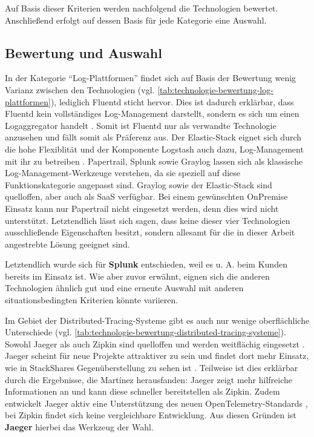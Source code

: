 Auf Basis dieser Kriterien werden nachfolgend die Technologien bewertet. Anschließend erfolgt auf dessen Basis für jede Kategorie eine Auswahl.

\subsection{Bewertung und Auswahl}
\label{subsec:bewertung-und-auswahl}

In der Kategorie \enquote{Log-Plattformen} findet sich auf Basis der Bewertung wenig Varianz zwischen den Technologien (vgl. \autoref{tab:technologie-bewertung-log-plattformen}), lediglich Fluentd sticht hervor. Dies ist dadurch erklärbar, dass Fluentd kein vollständiges Log-Management darstellt, sondern es sich um einen Logaggregator handelt \cite{FluentdAggregator}. Somit ist Fluentd nur als verwandte Technologie anzusehen und fällt somit als Präferenz aus. Der Elastic-Stack eignet sich durch die hohe Flexiblität und der Komponente Logstash auch dazu, Log-Management mit ihr zu betreiben  \cite{ThreatIdentificationFromAccessLogsUsingElasticStack} \cite{DesignLogManagementSystem}. Papertrail, Splunk sowie Graylog lassen sich als klassische Log-Management-Werkzeuge verstehen, da sie speziell auf diese Funktionskategorie angepasst sind. Graylog sowie der Elastic-Stack sind quelloffen, aber auch als SaaS verfügbar. Bei einem gewünschten OnPremise Einsatz kann nur Papertrail nicht eingesetzt werden, denn dies wird nicht unterstützt. Letztendlich lässt sich sagen, dass keine dieser vier Technologien ausschließende Eigenschaften besitzt, sondern allesamt für die in dieser Arbeit angestrebte Lösung geeignet sind.

Letztendlich wurde sich für \textbf{Splunk} entschieden, weil es u. A. beim Kunden bereits im Einsatz ist. Wie aber zuvor erwähnt, eignen sich die anderen Technologien ähnlich gut und eine erneute Auswahl mit anderen situationsbedingten Kriterien könnte variieren.



Im Gebiet der Distributed-Tracing-Systeme gibt es auch nur wenige oberflächliche Unterschiede (vgl. \autoref{tab:technologie-bewertung-distributed-tracing-systeme}). Sowohl Jaeger als auch Zipkin sind quelloffen und werden weitflächig eingesetzt \cite{AnalysisOfDistributedTracingSystemsEffectOnPerformance}. Jaeger scheint für neue Projekte attraktiver zu sein und findet dort mehr Einsatz, wie in StackShares Gegenüberstellung zu sehen ist \cite{StackShareJaegerVsZipkin}. Teilweise ist dies erklärbar durch die Ergebnisse, die Mart{\'i}nez \etal \cite{ComparisonOfE2ETestingToolsForMicroservices} herausfanden: Jaeger zeigt mehr hilfreiche Informationen an und kann diese schneller bereitstellen als Zipkin. Zudem entwickelt Jaeger aktiv eine Unterstützung des neuen OpenTelemetry-Standards \cite{JaegerOpenTelemetry}, bei Zipkin findet sich keine vergleichbare Entwicklung. Aus diesen Gründen ist \textbf{Jaeger} hierbei das Werkzeug der Wahl.

